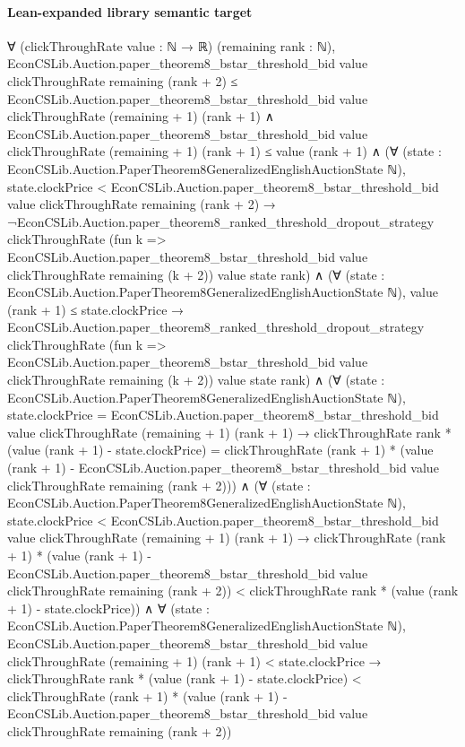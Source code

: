 \documentclass[10pt]{article}
\begin{document}
\paragraph{Lean-expanded library semantic target}
\begin{ReviewVerbatim}
∀ (clickThroughRate value : ℕ → ℝ) (remaining rank : ℕ),
  EconCSLib.Auction.paper_theorem8_bstar_threshold_bid value clickThroughRate remaining (rank + 2) ≤
      EconCSLib.Auction.paper_theorem8_bstar_threshold_bid value clickThroughRate (remaining + 1) (rank + 1) ∧
    EconCSLib.Auction.paper_theorem8_bstar_threshold_bid value clickThroughRate (remaining + 1) (rank + 1) ≤
        value (rank + 1) ∧
      (∀ (state : EconCSLib.Auction.PaperTheorem8GeneralizedEnglishAuctionState ℕ),
          state.clockPrice <
              EconCSLib.Auction.paper_theorem8_bstar_threshold_bid value clickThroughRate remaining (rank + 2) →
            ¬EconCSLib.Auction.paper_theorem8_ranked_threshold_dropout_strategy clickThroughRate
                (fun k => EconCSLib.Auction.paper_theorem8_bstar_threshold_bid value clickThroughRate remaining (k + 2))
                value state rank) ∧
        (∀ (state : EconCSLib.Auction.PaperTheorem8GeneralizedEnglishAuctionState ℕ),
            value (rank + 1) ≤ state.clockPrice →
              EconCSLib.Auction.paper_theorem8_ranked_threshold_dropout_strategy clickThroughRate
                (fun k => EconCSLib.Auction.paper_theorem8_bstar_threshold_bid value clickThroughRate remaining (k + 2))
                value state rank) ∧
          (∀ (state : EconCSLib.Auction.PaperTheorem8GeneralizedEnglishAuctionState ℕ),
              state.clockPrice =
                  EconCSLib.Auction.paper_theorem8_bstar_threshold_bid value clickThroughRate (remaining + 1)
                    (rank + 1) →
                clickThroughRate rank * (value (rank + 1) - state.clockPrice) =
                  clickThroughRate (rank + 1) *
                    (value (rank + 1) -
                      EconCSLib.Auction.paper_theorem8_bstar_threshold_bid value clickThroughRate remaining
                        (rank + 2))) ∧
            (∀ (state : EconCSLib.Auction.PaperTheorem8GeneralizedEnglishAuctionState ℕ),
                state.clockPrice <
                    EconCSLib.Auction.paper_theorem8_bstar_threshold_bid value clickThroughRate (remaining + 1)
                      (rank + 1) →
                  clickThroughRate (rank + 1) *
                      (value (rank + 1) -
                        EconCSLib.Auction.paper_theorem8_bstar_threshold_bid value clickThroughRate remaining
                          (rank + 2)) <
                    clickThroughRate rank * (value (rank + 1) - state.clockPrice)) ∧
              ∀ (state : EconCSLib.Auction.PaperTheorem8GeneralizedEnglishAuctionState ℕ),
                EconCSLib.Auction.paper_theorem8_bstar_threshold_bid value clickThroughRate (remaining + 1) (rank + 1) <
                    state.clockPrice →
                  clickThroughRate rank * (value (rank + 1) - state.clockPrice) <
                    clickThroughRate (rank + 1) *
                      (value (rank + 1) -
                        EconCSLib.Auction.paper_theorem8_bstar_threshold_bid value clickThroughRate remaining
                          (rank + 2))
\end{ReviewVerbatim}
\end{document}
